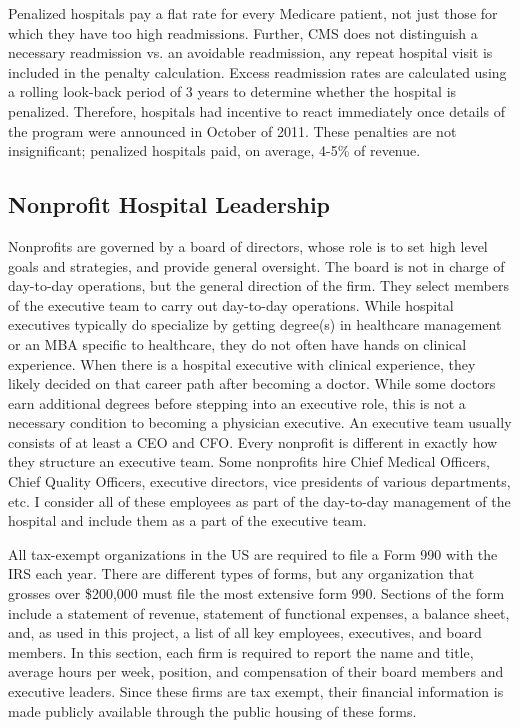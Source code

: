 \documentclass[12pt]{article}
\begin{document}
    Penalized hospitals pay a flat rate for every Medicare patient, not just those for which they have too high readmissions. Further, CMS does not distinguish a necessary readmission vs. an avoidable readmission, any repeat hospital visit is included in the penalty calculation. Excess readmission rates are calculated using a rolling look-back period of 3 years to determine whether the hospital is penalized. Therefore, hospitals had incentive to react immediately once details of the program were announced in October of 2011. These penalties are not insignificant; penalized hospitals paid, on average, 4-5\% of revenue. 

    \subsection{Nonprofit Hospital Leadership}

    Nonprofits are governed by a board of directors, whose role is to set high level goals and strategies, and provide general oversight. The board is not in charge of day-to-day operations, but the general direction of the firm. They select members of the executive team to carry out day-to-day operations. While hospital executives typically do specialize by getting degree(s) in healthcare management or an MBA specific to healthcare, they do not often have hands on clinical experience. When there is a hospital executive with clinical experience, they likely decided on that career path after becoming a doctor. While some doctors earn additional degrees before stepping into an executive role, this is not a necessary condition to becoming a physician executive. An executive team usually consists of at least a CEO and CFO. Every nonprofit is different in exactly how they structure an executive team. Some nonprofits hire Chief Medical Officers, Chief Quality Officers, executive directors, vice presidents of various departments, etc. I consider all of these employees as part of the day-to-day management of the hospital and include them as a part of the executive team. 

    All tax-exempt organizations in the US are required to file a Form 990 with the IRS each year. There are different types of forms, but any organization that grosses over \$200,000 must file the most extensive form 990. Sections of the form include a statement of revenue, statement of functional expenses, a balance sheet, and, as used in this project, a list of all key employees, executives, and board members. In this section, each firm is required to report the name and title, average hours per week, position, and compensation of their board members and executive leaders. Since these firms are tax exempt, their financial information is made publicly available through the public housing of these forms.  
\end{document}
